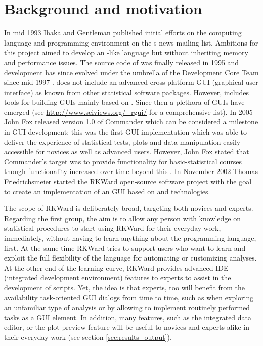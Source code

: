 \section{Background and motivation}
\label{background}
In mid 1993 Ihaka and Gentleman published initial efforts on the computing
language and programming environment  on the s-news mailing list. Ambitions for
this project aimed to develop an -like language but without inheriting memory
and performance issues. The source code of  was finally released in 1995 and
development has since evolved under the umbrella of the  Development Core Team
since mid 1997 \citep{RDCT2001, RDCT2010, Ihaka_Gentlemen_1993}.
 does not include an advanced cross-platform GUI (graphical user interface) as known from other
statistical software packages. However,  includes tools for building GUIs
mainly based on  \citep{Dalgaard2001, Dalgaard2002}. Since then a
plethora of  GUIs have emerged (see \url{http://www.sciviews.org/_rgui/} for a
comprehensive list). In 2005 John Fox released version 1.0 of  Commander which
can be considered a milestone in  GUI development; this was the first GUI
implementation which was able to deliver the experience of statistical tests,
plots and data manipulation easily accessible for  novices as well as advanced
users. However, John Fox stated that  Commander's target was to provide
functionality for basic-statistical courses though functionality increased over
time beyond this \citep{Fox2005, Fox2007}. In November 2002 Thomas Friedrichsmeier
started the RKWard open-source software project with the goal to create an
implementation of an  GUI based on  and  technologies.

The scope of RKWard is deliberately broad, targeting both  novices and experts.
Regarding the first group, the aim is to allow any person with knowledge on
statistical procedures to start using RKWard for their everyday work,
immediately, without having to learn anything about the  programming language,
first. At the same time RKWard tries to support users who want to learn and
exploit the full flexibility of the  language for automating or customizing
analyses. At the other end of the learning curve, RKWard provides advanced IDE (integrated development environment)
features to  experts to assist in the development of  scripts. Yet, the idea
is that  experts, too will benefit from the availability task-oriented GUI
dialogs from time to time, such as when exploring an unfamiliar type of analysis
or by allowing to implement routinely performed tasks as a GUI element. In
addition, many features, such as the integrated data editor, or the plot preview
feature will be useful to  novices and  experts alike in their everyday work
(see section \ref{sec:results_output}).

